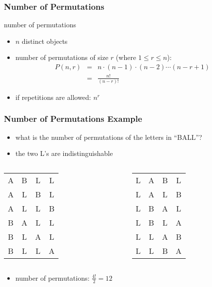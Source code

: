 \documentclass[dvipsnames]{beamer}
\begin{document}
\begin{frame}
  \frametitle{Number of Permutations}

  \begin{block}{number of permutations}
    \begin{itemize}
      \item $n$ distinct objects
      \item number of permutations of size $r$ (where $1 \leq r \leq n$):\\
      \begin{eqnarray*}
        P(n,r) & = & n \cdot (n-1) \cdot (n-2) \cdots (n-r+1)\\
               & = & \frac{n!}{(n-r)!}
      \end{eqnarray*}

      \pause
      \medskip
      \item if repetitions are allowed: $n^r$
    \end{itemize}
  \end{block}
\end{frame}

\begin{frame}
  \frametitle{Number of Permutations Example}

  \begin{example}
    \begin{itemize}
      \item what is the number of permutations of the letters in ``BALL''?
      \item the two L's are indistinguishable
    \end{itemize}

    \pause
    \begin{columns}[t]
      \begin{tabular}{c c c c}
 A & B & L & L\\
 A & L & B & L\\
 A & L & L & B\\
 B & A & L & L\\
 B & L & A & L\\
 B & L & L & A
      \end{tabular}

      \begin{tabular}{c c c c}
 L & A & B & L\\
 L & A & L & B\\
 L & B & A & L\\
 L & B & L & A\\
 L & L & A & B\\
 L & L & B & A
      \end{tabular}
    \end{columns}

    \pause
    \begin{itemize}
      \item number of permutations: $\frac{4!}{2} = 12$
    \end{itemize}
  \end{example}
\end{frame}
\end{document}
